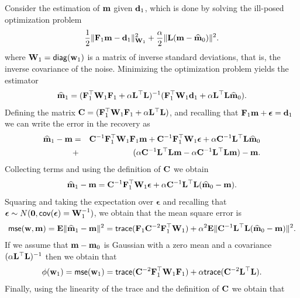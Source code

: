 \documentclass[11pt]{article}
\newcommand{\bfC}	{{\bf{C}}}
\newcommand{\bfE}	{{\bf{E}}}
\newcommand{\bfF}	{{\bf{F}}}
\newcommand{\bfL}	{{\bf{L}}}
\newcommand{\bfW}	{{\bf{W}}}
\newcommand{\bfd}	{{\bf{d}}}
\newcommand{\bfm}	{{\bf{m}}}
\newcommand{\bfw}	{{\bf{w}}}
\newcommand{\hf}        {{\frac 12}}
\newcommand{\bfepsilon} {{\boldsymbol \epsilon}}
\newcommand{\bfmhat}    {{\widehat{\bfm}}}
\newcommand{\LtL}       { \bfL^{\top}\bfL}
\newcommand {\zero}  { {\bf 0} }
\renewcommand{\hf}		 {\frac12}
\renewcommand{\bfmhat}	{\widehat{\bf m}}
\begin{document}
{Consider  the estimation of $\bfm$ given $\bfd_{1}$, which is done by solving the ill-posed optimization problem
\begin{eqnarray}
\label{mest1}
\hf \| \bfF_{1} \bfm - \bfd_{1}\|^{2}_{\bfW_{1}} + {\frac {\alpha} 2}
\|\bfL (\bfm - \bfmhat_{0}) \|^{2}. 
\end{eqnarray}
where $\bfW_{1} = {\sf diag}(\bfw_{1})$ is a matrix of inverse standard deviations, 
that is, the inverse covariance of the noise.
Minimizing the  optimization problem yields the estimator
\begin{eqnarray}
\label{mest}
\widehat \bfm_{1} = (\bfF_{1}^{\top} \bfW_{1}\bfF_{1} + \alpha \bfL^{\top} \bfL)^{-1} (\bfF_{1}^{\top} \bfW_{1} \bfd_{1}
+ \alpha \LtL \bfmhat_{0}).
\end{eqnarray}
Defining the matrix $\bfC = (\bfF_{1}^{\top} \bfW_{1}\bfF_{1} + \alpha \LtL)$, and recalling that $\bfF_1\bfm + \bfepsilon = \bfd_1$ we can write
the error in the recovery as
\begin{eqnarray}
\bfmhat_1 -\bfm &=& \bfC^{-1} \bfF_{1}^{\top} \bfW_{1}\bfF_{1} \bfm + \bfC^{-1} \bfF_{1}^{\top} \bfW_{1}\bfepsilon + \alpha
\bfC^{-1} \LtL \bfmhat_{0} \\
&+& (\alpha \bfC^{-1} \LtL\bfm
- \alpha \bfC^{-1} \LtL \bfm) 
 -\bfm.
\end{eqnarray}
Collecting terms and using the definition of $\bfC$ we obtain
\begin{eqnarray}
\label{diffmod}
\bfmhat_1 -\bfm = \bfC^{-1} \bfF_{1}^{\top} \bfW_{1} \bfepsilon + \alpha \bfC^{-1} \LtL (\bfmhat_{0} - \bfm).
\end{eqnarray}
Squaring and taking the expectation over $\bfepsilon$ and recalling that $ \bfepsilon \sim N(\zero,{\sf cov}(\bfepsilon) = \bfW_{1}^{-1})$, we obtain that the mean square error is
\begin{eqnarray}
{\sf mse}(\bfw,\bfm) = \bfE\| \bfmhat_1 -\bfm \|^{2} = {\sf trace}(   \bfF_{1} \bfC^{-2} \bfF_{1}^{\top} \bfW_{1})  + 
\alpha^2 \bfE\| \bfC^{-1} \LtL (\bfmhat_{0} - \bfm) \|^{2}.
\end{eqnarray}
If we assume that $\bfm-\bfm_{0}$ is Gaussian with a zero mean and a covariance
$(\alpha \LtL)^{-1}$ then we obtain that
\begin{eqnarray}
\phi(\bfw_1 ) = {\sf mse}(\bfw_1) = {\sf trace}(    \bfC^{-2} \bfF_{1}^{\top}\bfW_{1}\bfF_{1} )  + 
 \alpha {\sf trace} (\bfC^{-2} \LtL) . 
\end{eqnarray}
Finally, using the linearity of the trace and the definition of $\bfC$ we obtain that
\begin{eqnarray}

\end{eqnarray}}
\end{document}
